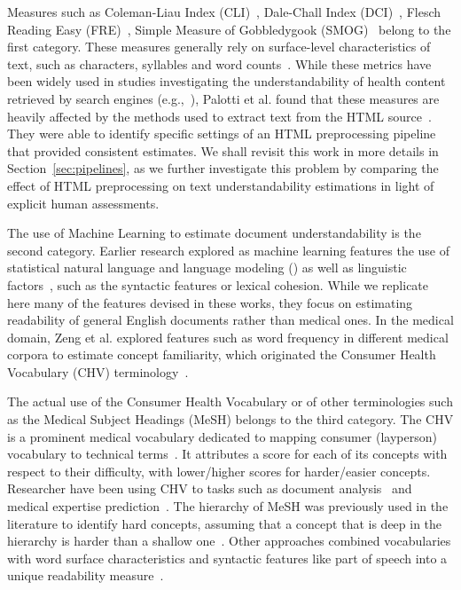 Measures such as Coleman-Liau Index (CLI)~\cite{cli75}, Dale-Chall Index (DCI)~\cite{dale48}, Flesch Reading Easy (FRE)~\cite{flesch75}, Simple Measure of Gobbledygook (SMOG)~\cite{smog69} belong to the first category. These measures generally rely on surface-level characteristics of text, such as characters, syllables and word counts~\cite{dubay04}.
While these metrics have been widely used in studies investigating the understandability of health content retrieved by search engines (e.g.,~\cite{becker04,graber99,fitzsimmons10,stossel12,wiener13,patel13,atcherson14,meillier17}), Palotti et al. found that these measures are heavily affected by the methods used to extract text from the HTML source~\cite{palotti15}. They were able to identify specific settings of an HTML preprocessing pipeline that provided consistent  estimates. We shall revisit this work in more details in Section~\ref{sec:pipelines}, as we further investigate this problem by comparing the effect of HTML preprocessing on text understandability estimations in light of explicit human assessments. 

The use of Machine Learning to estimate document understandability is the second category. Earlier research explored as machine learning features the use of statistical natural language and language modeling (\cite{liu04,collins05,heilman07}) as well as linguistic factors~\cite{pitler08}, such as the syntactic features or lexical cohesion. While we replicate here many of the features devised in these works, they focus on estimating readability of general English documents rather than medical ones. In the medical domain, Zeng et al. explored features such as word frequency in different medical corpora to estimate concept familiarity, which originated the Consumer Health Vocabulary (CHV) terminology~\cite{zeng05,zeng06,zeng08}.  

The actual use of the Consumer Health Vocabulary or of other terminologies such as the Medical Subject Headings (MeSH) belongs to the third category. The CHV is a prominent medical vocabulary dedicated to mapping consumer (layperson) vocabulary to technical terms~\cite{zeng06}. It attributes a score for each of its concepts with respect to their difficulty, with lower/higher scores for harder/easier concepts. Researcher have been using CHV to tasks such as document analysis~\cite{leroy08} and medical expertise prediction~\cite{palotti14}.
The hierarchy of MeSH was previously used in the literature to identify hard concepts, assuming that a concept that is deep in the hierarchy is harder than a shallow one~\cite{yan11}. Other approaches combined vocabularies with word surface characteristics and syntactic features like part of speech into a unique readability measure~\cite{kim2007beyond}.

